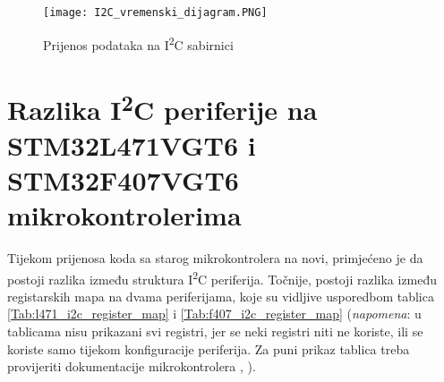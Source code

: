 \begin{figure}[hp]
	\centering
	\texttt{[image: I2C\_vremenski\_dijagram.PNG]}
	\caption{Prijenos podataka na I\textsuperscript{2}C sabirnici \cite{i2c_manual}}
	\label{fig:i2c_timing_diagram_transaction}
\end{figure}

\section{Razlika I\textsuperscript{2}C periferije na STM32L471VGT6 i \newline STM32F407VGT6 mikrokontrolerima}

Tijekom prijenosa koda sa starog mikrokontrolera na novi, primjećeno je da postoji razlika između struktura I\textsuperscript{2}C periferija. Točnije, postoji razlika između registarskih mapa na dvama periferijama, koje su vidljive usporedbom tablica \ref{Tab:l471_i2c_register_map} i \ref{Tab:f407_i2c_register_map} (\textit{napomena}: u tablicama nisu prikazani svi registri, jer se neki registri niti ne koriste, ili se koriste samo tijekom konfiguracije periferija. Za puni prikaz tablica treba provijeriti dokumentacije mikrokontrolera \cite{f407_manual}, \citep{l471_manual}).

